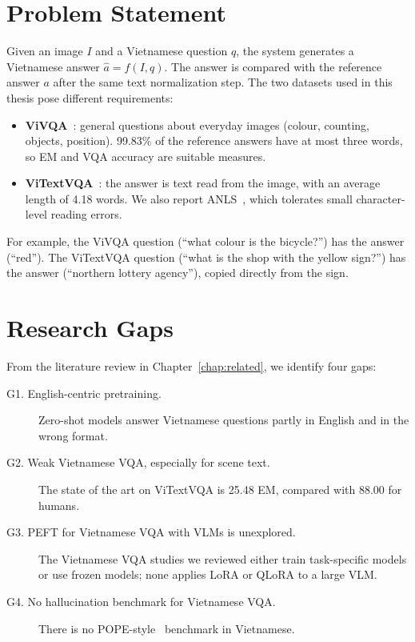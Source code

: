 \section{Problem Statement}
\label{sec:intro-problem}

Given an image $I$ and a Vietnamese question $q$, the system generates a
Vietnamese answer $\hat{a} = f(I, q)$. The answer is compared with the reference
answer $a$ after the same text normalization step. The two datasets used in
this thesis pose different requirements:

\begin{itemize}
  \item \textbf{ViVQA}~\cite{tran2021vivqa}: general questions about everyday
  images (colour, counting, objects, position). 99.83\% of the reference answers
  have at most three words, so EM and VQA accuracy are suitable measures.
  \item \textbf{ViTextVQA}~\cite{nguyen2024vitextvqa}: the answer is text read
  from the image, with an average length of 4.18 words. We also report
  ANLS~\cite{biten2019stvqa}, which tolerates small character-level reading
  errors.
\end{itemize}

For example, the ViVQA question  (``what colour
is the bicycle?'') has the answer  (``red''). The ViTextVQA
question  (``what is the shop with
the yellow sign?'') has the answer  (``northern
lottery agency''), copied directly from the sign.

\section{Research Gaps}
\label{sec:intro-gaps}

From the literature review in Chapter~\ref{chap:related}, we identify four gaps:

\begin{description}
  \item[G1. English-centric pretraining.] Zero-shot models answer Vietnamese
  questions partly in English and in the wrong format.
  \item[G2. Weak Vietnamese VQA, especially for scene text.] The state of the art
  on ViTextVQA is 25.48 EM, compared with 88.00 for humans.
  \item[G3. PEFT for Vietnamese VQA with VLMs is unexplored.] The Vietnamese VQA
  studies we reviewed either train task-specific models or use frozen models;
  none applies LoRA or QLoRA to a large VLM.
  \item[G4. No hallucination benchmark for Vietnamese VQA.] There is no
  POPE-style~\cite{li2023pope} benchmark in Vietnamese.
\end{description}

